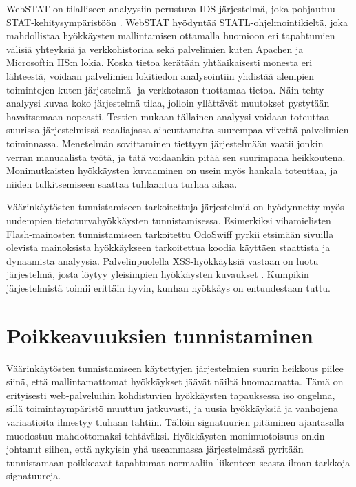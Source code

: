 WebSTAT \cite{Webstat} on tilalliseen analyysiin perustuva IDS-järjestelmä, joka pohjautuu STAT-kehitysympäristöön \cite{STAT}. WebSTAT hyödyntää STATL-ohjelmointikieltä, joka mahdollistaa hyökkäysten
mallintamisen ottamalla huomioon eri tapahtumien välisiä yhteyksiä ja verkkohistoriaa sekä palvelimien kuten Apachen ja Microsoftin IIS:n lokia. Koska tietoa kerätään yhtäaikaisesti monesta eri 
lähteestä, voidaan palvelimien lokitiedon analysointiin yhdistää alempien toimintojen kuten jär\-jes\-tel\-mä- ja verkkotason tuottamaa tietoa. Näin tehty analyysi kuvaa koko järjestelmä tilaa, jolloin 
yllättävät muutokset pystytään havaitsemaan nopeasti. Testien mukaan tällainen analyysi voidaan toteuttaa suurissa järjestelmissä reaaliajassa aiheuttamatta suurempaa viivettä palvelimien toiminnassa. 
Menetelmän sovittaminen tiettyyn järjestelmään vaatii jonkin verran manuaalista työtä, ja tätä voidaankin pitää sen suurimpana heikkoutena. Monimutkaisten hyökkäysten kuvaaminen on usein myös hankala
toteuttaa, ja niiden tulkitsemiseen saattaa tuhlaantua turhaa aikaa.

Väärinkäytösten tunnistamiseen tarkoitettuja järjestelmiä on hyödynnetty myös uudempien tietoturvahyökkäysten tunnistamisessa. Esimerkiksi vihamielisten Flash-mainosten tunnistamiseen tarkoitettu 
OdoSwiff \cite{FlashAdd} pyrkii etsimään sivuilla olevista mainoksista hyökkäykseen tarkoitettua koodia käyttäen staattista ja dynaamista analyysia. Palvelinpuolella XSS-hyökkäyksiä vastaan on luotu 
järjestelmä, josta löytyy yleisimpien hyökkäysten kuvaukset \cite{SignatureXSS}. Kumpikin järjestelmistä toimii erittäin hyvin, kunhan hyökkäys on entuudestaan tuttu.

\section{Poikkeavuuksien tunnistaminen}

Väärinkäytösten tunnistamiseen käytettyjen järjestelmien suurin heikkous piilee siinä, että mallintamattomat hyökkäykset jäävät näiltä huomaamatta. Tämä on erityisesti web-palveluihin kohdistuvien
hyökkäysten tapauksessa iso ongelma, sillä toimintaympäristö muuttuu jatkuvasti, ja uusia hyökkäyksiä ja vanhojena variaatioita ilmestyy tiuhaan tahtiin. Tällöin signatuurien pitäminen ajantasalla
muodostuu mahdottomaksi tehtäväksi. Hyökkäysten monimuotoisuus onkin johtanut siihen, että nykyisin yhä useammassa järjestelmässä pyritään tunnistamaan poikkeavat tapahtumat normaaliin liikenteen seasta
ilman tarkkoja signatuureja. 

